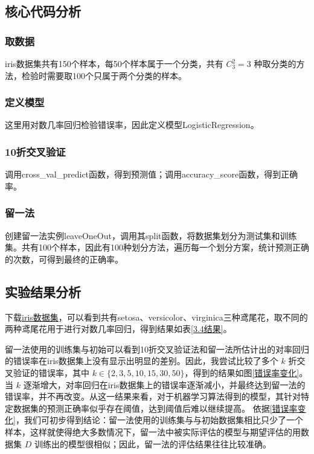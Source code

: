 \documentclass{ctexart}
\begin{document}
	\subsection{核心代码分析}
	\subsubsection{取数据}
	iris数据集共有150个样本，每50个样本属于一个分类，共有 $C_3^2=3$ 种取分类的方法，检验时需要取100个只属于两个分类的样本。
	
	\subsubsection{定义模型}
	这里用对数几率回归检验错误率，因此定义模型LogisticRegression。
	
	\subsubsection{10折交叉验证}
	调用cross\_val\_predict函数，得到预测值；调用accuracy\_score函数，得到正确率。
	
	\subsubsection{留一法}
	创建留一法实例leaveOneOut，调用其split函数，将数据集划分为测试集和训练集。共有100个样本，因此有100种划分方法，遍历每一个划分方案，统计预测正确的次数，可得到最终的正确率。
	
	\subsection{实验结果分析}
	
	下载\href{https://archive.ics.uci.edu/ml/machine-learning-databases/iris/iris.data}{iris数据集}，可以看到共有setosa、versicolor、virginica三种鸢尾花，取不同的两种鸢尾花用于进行对数几率回归，得到结果如表\ref{3.4结果}。
	
	留一法使用的训练集与初始可以看到10折交叉验证法和留一法所估计出的对率回归的错误率在iris数据集上没有显示出明显的差别。因此，我尝试比较了多个 $k$ 折交叉验证的错误率，其中 $k\in\{2,3,5,10,15,30,50\}$，得到的结果如图\ref{错误率变化}。当 $k$ 逐渐增大，对率回归在iris数据集上的错误率逐渐减小，并最终达到留一法的错误率，并不再改变。从这一结果来看，对于机器学习算法得到的模型，其针对特定数据集的预测正确率似乎存在阈值，达到阈值后难以继续提高。
	依据\ref{错误率变化}，我们可初步得到结论：留一法使用的训练集与与初始数据集相比只少了一个样本，这样就使得绝大多数情况下，留一法中被实际评估的模型与期望评估的用数据集 $D$ 训练出的模型很相似；因此，留一法的评估结果往往比较准确。
	
\end{document}
